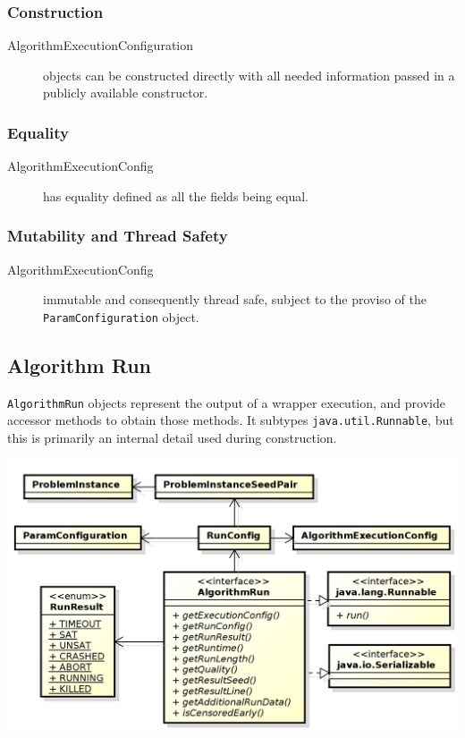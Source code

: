 \documentclass[11pt,letterpaper,oneside]{article}
\begin{document}
\subsubsection{Construction}
\begin{description}
\item[AlgorithmExecutionConfiguration] objects can be constructed directly with all needed information passed in a publicly available constructor.
\end{description}


\subsubsection{Equality}
\begin{description}
\item[AlgorithmExecutionConfig] has equality defined as all the fields being equal.
\end{description}

\subsubsection{Mutability and Thread Safety}
\begin{description}
\item[AlgorithmExecutionConfig] immutable and consequently thread safe, subject to the proviso of the \texttt{ParamConfiguration} object.
\end{description}

\subsection{Algorithm Run} 

\texttt{AlgorithmRun} objects represent the output of a wrapper execution, and provide accessor methods to obtain those methods. It subtypes \texttt{java.util.Runnable}, but this is primarily an internal detail used during construction.

\begin{center}
\includegraphics[scale=0.75]{img/UML/AlgorithmRun.png}
\end{center}
\end{document}
